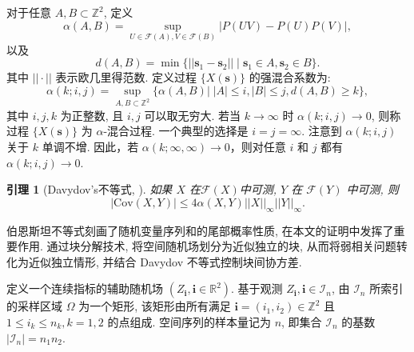 \documentclass[a4paper,openay,14pt]{ctexbook}
\numberwithin{equation}{section}
\numberwithin{lem}{section}
\newtheorem{lemma}[theorem]{引理}%
\newtheorem{rema}[theorem]{注}%
\begin{document}
对于任意 $A, B \subset \mathbb{Z}^2$, 定义
\[
\alpha(A, B) = \sup_{U \in \mathcal{F}(A), V \in \mathcal{F}(B)} \big|P(UV) - P(U)P(V)\big|,
\]
以及
\[
d(A, B) = \min \{||\mathbf{s}_1 - \mathbf{s}_2|| \mid \mathbf{s}_1 \in A, \mathbf{s}_2 \in B\}.
\]
其中 $||\cdot||$ 表示欧几里得范数. 定义过程 $\{X(\mathbf{s})\}$ 的强混合系数为:
\[
\alpha(k; i, j) = \sup_{A,B \subset \mathbb{Z}^2} \{  \alpha(A, B)| \; |A| \leq i, |B| \leq j, d(A,B) \geq k\}, 
\]
其中 $i, j, k$ 为正整数, 且 $i, j$ 可以取无穷大. 若当 $k \to \infty$ 时 $\alpha(k; i, j) \to 0$, 则称过程 $\{X(\mathbf{s})\}$ 为 $\alpha$-混合过程. 一个典型的选择是 $i = j = \infty$. 注意到 $\alpha(k; i, j)$ 关于 $k$ 单调不增. 因此，若 $\alpha(k; \infty, \infty) \to 0$，则对任意 $i$ 和 $j$ 都有 $\alpha(k; i, j) \to 0$.


\begin{lemma}[Davydov's不等式, \cite{fazekas2003limit}]
如果 $X$ 在$\mathcal{F}(X)$中可测, $Y$ 在 $\mathcal{F}(Y)$ 中可测, 则
\[
| \mathrm{Cov} (X, Y)| \leq 4\alpha(X, Y)||X||_{\infty}||Y||_{\infty}.
\]
\end{lemma}

伯恩斯坦不等式刻画了随机变量序列和的尾部概率性质, 在本文的证明中发挥了重要作用. 通过块分解技术, 将空间随机场划分为近似独立的块, 从而将弱相关问题转化为近似独立情形, 并结合 Davydov 不等式控制块间协方差.





定义一个连续指标的辅助随机场 $(Z_{\mathbf{i}}, \mathbf{i}\in\mathbb{R}^2)$. 基于观测 ${Z_{\mathbf{i}}, \mathbf{i}\in\mathcal{I}_n}$, 由 $\mathcal{I}_n$ 所索引的采样区域 $\Omega$ 为一个矩形, 该矩形由所有满足 $\mathbf{i}=(i_1,i_2)\in\mathbb{Z}^2$ 且 $1\le i_k\le n_k, k=1,2$ 的点组成. 空间序列的样本量记为 $n$, 即集合 $\mathcal{I}_n$ 的基数 $|\mathcal{I}_n|=n_1 n_2$.
\end{document}

